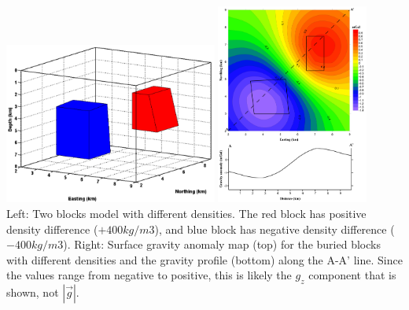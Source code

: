 \begin{center}
\includegraphics[width=7cm]{python_codes/fieldstone_113/images/uwms19_c}
\includegraphics[width=5cm]{python_codes/fieldstone_113/images/uwms19_d}\\
{\captionfont Left: Two blocks model with different densities. The red block 
has positive density difference ($+400 kg/m3$), and blue block has negative density
difference ($-400 kg/m3$). Right: Surface gravity anomaly map (top) for the 
buried blocks with different densities and the gravity profile (bottom) along the A-A' line.
Since the values range from negative to positive, this is likely the $g_z$
component that is shown, not $|\vec{g}|$.}
\end{center}

